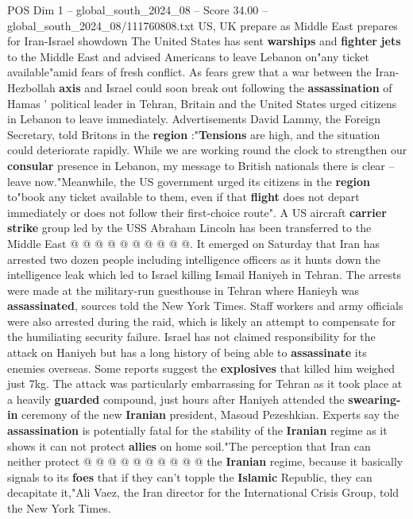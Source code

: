 \begin{textsample}{POS Dim 1 – global\_south\_2024\_08 – Score 34.00 – global\_south\_2024\_08/111760808.txt}  \label{ex:f1_pos_003}
US, UK prepare as Middle East prepares for Iran-Israel showdown The United States has sent \textbf{warships} and \textbf{fighter} \textbf{jets} to the Middle East and advised Americans to leave Lebanon on"any ticket available"amid fears of fresh conflict.
As fears grew that a war between the Iran-Hezbollah \textbf{axis} and Israel could soon break out following the \textbf{assassination} of Hamas ' political leader in Tehran, Britain and the United States urged citizens in Lebanon to leave immediately.
Advertisements David Lammy, the Foreign Secretary, told Britons in the \textbf{region} :"\textbf{Tensions} are high, and the situation could deteriorate rapidly.
While we are working round the clock to strengthen our \textbf{consular} presence in Lebanon, my message to British nationals there is clear -- leave now."Meanwhile, the US government urged its citizens in the \textbf{region} to"book any ticket available to them, even if that \textbf{flight} does not depart immediately or does not follow their first-choice route".
A US aircraft \textbf{carrier} \textbf{strike} group led by the USS Abraham Lincoln has been transferred to the Middle East @ @ @ @ @ @ @ @ @ @.
It emerged on Saturday that Iran has arrested two dozen people including intelligence officers as it hunts down the intelligence leak which led to Israel killing Ismail Haniyeh in Tehran.
The arrests were made at the military-run guesthouse in Tehran where Hanieyh was \textbf{assassinated}, sources told the New York Times.
Staff workers and army officials were also arrested during the raid, which is likely an attempt to compensate for the humiliating security failure.
Israel has not claimed responsibility for the attack on Haniyeh but has a long history of being able to \textbf{assassinate} its enemies overseas.
Some reports suggest the \textbf{explosives} that killed him weighed just 7kg.
The attack was particularly embarrassing for Tehran as it took place at a heavily \textbf{guarded} compound, just hours after Haniyeh attended the \textbf{swearing-in} ceremony of the new \textbf{Iranian} president, Masoud Pezeshkian.
Experts say the \textbf{assassination} is potentially fatal for the stability of the \textbf{Iranian} regime as it shows it can not protect \textbf{allies} on home soil."The perception that Iran can neither protect @ @ @ @ @ @ @ @ @ @ the \textbf{Iranian} regime, because it basically signals to its \textbf{foes} that if they can't topple the \textbf{Islamic} Republic, they can decapitate it,"Ali Vaez, the Iran director for the International Crisis Group, told the New York Times.

\end{textsample}

